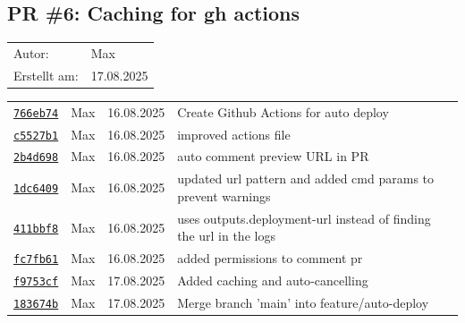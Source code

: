\documentclass{article}%
\begin{document}
\subsection{PR \#6: Caching for gh actions}%
\label{pr:6}%
\begin{tabular}{l l}%
Autor:&Max\\%
Erstellt am: &17.08.2025\\%
\end{tabular}%
\begin{longtable}{l l l p{12cm}}%
\href{https://github.com/scriptor1000/homeworks/pull/6/commits/766eb74bd9ff1b4c19d919f2396f99be1f58289e}{\underline{\texttt{766eb74}}}&Max&16.08.2025&Create Github Actions for auto deploy\\%
\href{https://github.com/scriptor1000/homeworks/pull/6/commits/c5527b12dbfebe636caa050e19a3f5b9d82d3486}{\underline{\texttt{c5527b1}}}&Max&16.08.2025&improved actions file\\%
\href{https://github.com/scriptor1000/homeworks/pull/6/commits/2b4d6989795b7f18614e2a868b369abeb93c8f07}{\underline{\texttt{2b4d698}}}&Max&16.08.2025&auto comment preview URL in PR\\%
\href{https://github.com/scriptor1000/homeworks/pull/6/commits/1dc6409ce4396a315705d68a38b08defad295e18}{\underline{\texttt{1dc6409}}}&Max&16.08.2025&updated url pattern and added cmd params to prevent warnings\\%
\href{https://github.com/scriptor1000/homeworks/pull/6/commits/411bbf8309e7825863e68ce332b40801a102d072}{\underline{\texttt{411bbf8}}}&Max&16.08.2025&uses outputs.deployment{-}url instead of finding the url in the logs\\%
\href{https://github.com/scriptor1000/homeworks/pull/6/commits/fc7fb61c2206cf600297e4cd3ceba2bcbd4a9d38}{\underline{\texttt{fc7fb61}}}&Max&16.08.2025&added permissions to comment pr\\%
\href{https://github.com/scriptor1000/homeworks/pull/6/commits/f9753cf1c64ddf42dd3c44d138dfb3d86baeab29}{\underline{\texttt{f9753cf}}}&Max&17.08.2025&Added caching and auto{-}cancelling\\%
\href{https://github.com/scriptor1000/homeworks/pull/6/commits/183674be8dfc78f59c6facf12861e89f19c918b0}{\underline{\texttt{183674b}}}&Max&17.08.2025&Merge branch 'main' into feature/auto{-}deploy\\%
\end{longtable}

%
\end{document}
